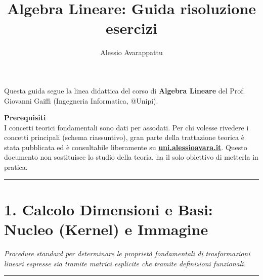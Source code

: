 \documentclass[10pt,a4paper]{article}
\title{\textbf{Algebra Lineare: Guida risoluzione esercizi}}
\author{Alessio Avarappattu}
\begin{document}
\maketitle
\section*{}

Questa guida segue la linea didattica del corso di \textbf{Algebra Lineare} del Prof. Giovanni Gaiffi (Ingegneria Informatica, @Unipi).

\medskip

\textbf{Prerequisiti}
\\ I concetti teorici fondamentali sono dati per assodati. Per chi volesse rivedere i concetti principali (schema riassuntivo), gran parte della trattazione teorica è stata pubblicata ed è consultabile liberamente su \href{https://uni.alessioavara.it/algebra-lineare/teoria}{\textbf{uni.alessioavara.it}}.
Questo documento non sostituisce lo studio della teoria, ha il solo obiettivo di metterla in pratica.

\medskip


\vspace{0.5cm}
\hrule
\vspace{1cm}
\section*{1. Calcolo Dimensioni e Basi: Nucleo (Kernel) e Immagine}
\textit{Procedure standard per determinare le proprietà fondamentali di trasformazioni lineari espresse sia tramite matrici esplicite che tramite definizioni funzionali.}

\hrule
\vspace{0.4cm}
\end{document}
